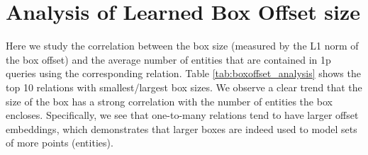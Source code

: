 \section{Analysis of Learned Box Offset size}\label{app:offset_analysis}
Here we study the correlation between the box size (measured by the L1 norm of the box offset) and the average number of entities that are contained in 1p queries using the corresponding relation. Table \ref{tab:boxoffset_analysis} shows the top 10 relations with smallest/largest box sizes.
We observe a clear trend that the size of the box has a strong correlation with the number of entities the box encloses. Specifically, we see that one-to-many relations tend to have larger offset embeddings, which demonstrates that larger boxes are indeed used to model sets of more points (entities).


